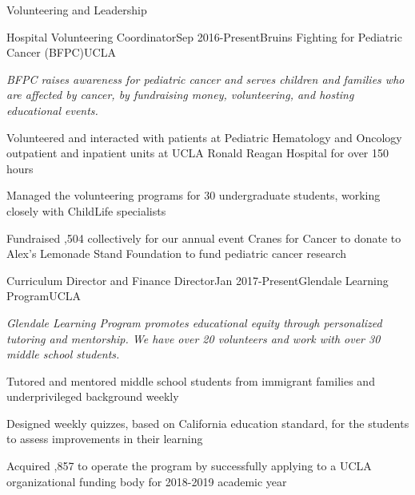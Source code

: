 \documentclass{resume} %
\begin{document}

\begin{rSection}{Volunteering and Leadership}

\begin{rSubsection}{Hospital Volunteering Coordinator}{Sep 2016-Present}{Bruins Fighting for Pediatric Cancer (BFPC)}{UCLA}
\item[] {\em BFPC raises awareness for pediatric cancer and serves children and families who are affected by cancer, by fundraising money, volunteering, and hosting educational events. }
\item Volunteered and interacted with patients at Pediatric Hematology and Oncology outpatient and inpatient units at UCLA Ronald Reagan Hospital for over 150 hours
\item Managed the volunteering programs for 30 undergraduate students, working closely with ChildLife specialists
\item Fundraised ,504 collectively for our annual event Cranes for Cancer to donate to Alex's Lemonade Stand Foundation to fund pediatric cancer research\end{rSubsection}

\begin{rSubsection}{Curriculum Director and Finance Director}{Jan 2017-Present}{Glendale Learning Program}{UCLA}
\item[] {\em Glendale Learning Program promotes educational equity through personalized tutoring and mentorship. We have over 20 volunteers and work with over 30 middle school students.}
\item Tutored and mentored middle school students from immigrant families and underprivileged background weekly
\item Designed weekly quizzes, based on California education standard, for the students to assess improvements in their learning
\item Acquired ,857 to operate the program by successfully applying to a UCLA organizational funding body for 2018-2019 academic year
\end{rSubsection}

\end{rSection}


\end{document}
